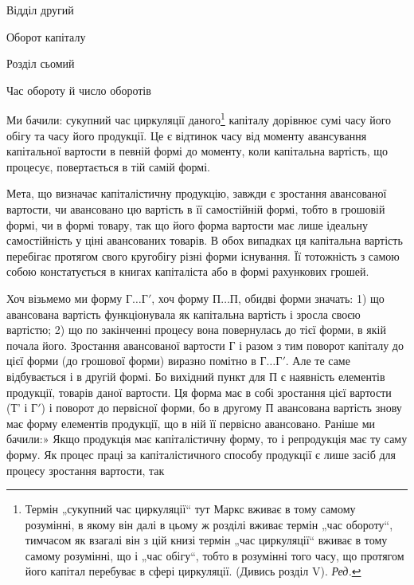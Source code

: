 Відділ другий

Оборот капіталу

Розділ сьомий

Час обороту й число оборотів

Ми бачили: сукупний час циркуляції даного\footnote*{
Термін „сукупний час циркуляції“ тут Маркс вживає в тому самому розумінні,
в якому він далі в цьому ж розділі вживає термін „час обороту“, тимчасом
як взагалі він з цій книзі термін „час циркуляції“ вживає в тому самому
розумінні, що і „час обігу“, тобто в розумінні того часу, що протягом його капітал
перебуває в сфері циркуляції. (Дивись розділ V). \emph{Ред.}
} капіталу дорівнює сумі
часу його обігу та часу його продукції. Це є відтинок часу від моменту
авансування капітальної вартости в певній формі до моменту, коли капітальна
вартість, що процесує, повертається в тій самій формі.

Мета, що визначає капіталістичну продукцію, завжди є зростання
авансованої вартости, чи авансовано цю вартість в її самостійній формі,
тобто в грошовій формі, чи в формі товару, так що його форма вартости
має лише ідеальну самостійність у ціні авансованих товарів.
В обох випадках ця капітальна вартість перебігає протягом свого кругобігу
різні форми існування. Її тотожність з самою собою констатується
в книгах капіталіста або в формі рахункових грошей.

Хоч візьмемо ми форму $Г\dots{} Г'$, хоч форму $П\dots{} П$, обидві форми
значать: 1) що авансована вартість функціонувала як капітальна вартість
і зросла своєю вартістю; 2) що по закінченні процесу вона повернулась
до тієї форми, в якій почала його. Зростання авансованої вартости Г і
разом з тим поворот капіталу до цієї форми (до грошової форми) виразно
помітно в $Г\dots{} Г'$. Але те саме відбувається і в другій формі. Бо
вихідний пункт для П є наявність елементів продукції, товарів даної
вартости. Ця форма має в собі зростання цієї вартости (Т' і $Г'$) і поворот
до первісної форми, бо в другому П авансована вартість
знову має форму елементів продукції, що в ній її первісно авансовано.
Раніше ми бачили:» Якщо продукція має капіталістичну форму, то
і репродукція має ту саму форму. Як процес праці за капіталістичного
способу продукції є лише засіб для процесу зростання вартости, так
\parbreak{}  %
